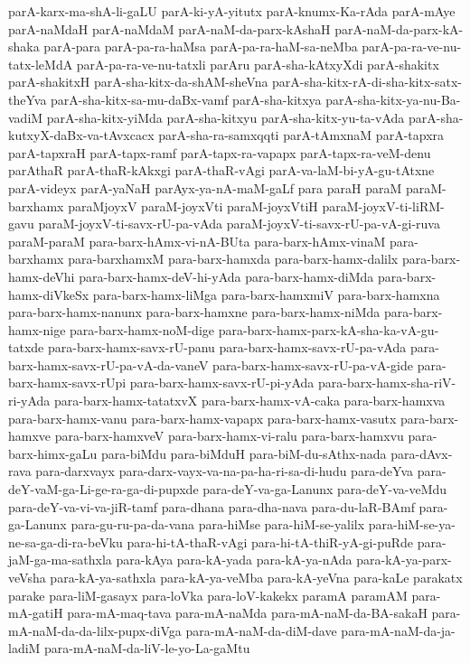 {parA-karx-ma-shA-li-gaLU
parA-ki-yA-yitutx
parA-knumx-Ka-rAda
parA-mAye
parA-naMdaH
parA-naMdaM
parA-naM-da-parx-kAshaH
parA-naM-da-parx-kA-shaka
parA-para
parA-pa-ra-haMsa
parA-pa-ra-haM-sa-neMba
parA-pa-ra-ve-nu-tatx-leMdA
parA-pa-ra-ve-nu-tatxli
parAru
parA-sha-kAtxyXdi
parA-shakitx
parA-shakitxH
parA-sha-kitx-da-shAM-sheVna
parA-sha-kitx-rA-di-sha-kitx-satx-theYva
parA-sha-kitx-sa-mu-daBx-vamf
parA-sha-kitxya
parA-sha-kitx-ya-nu-Ba-vadiM
parA-sha-kitx-yiMda
parA-sha-kitxyu
parA-sha-kitx-yu-ta-vAda
parA-sha-kutxyX-daBx-va-tAvxcacx
parA-sha-ra-samxqqti
parA-tAmxnaM
parA-tapxra
parA-tapxraH
parA-tapx-ramf
parA-tapx-ra-vapapx
parA-tapx-ra-veM-denu
parAthaR
parA-thaR-kAkxgi
parA-thaR-vAgi
parA-va-laM-bi-yA-gu-tAtxne
parA-videyx
parA-yaNaH
parAyx-ya-nA-maM-gaLf
para
paraH
paraM
paraM-barxhamx
paraMjoyxV
paraM-joyxVti
paraM-joyxVtiH
paraM-joyxV-ti-liRM-gavu
paraM-joyxV-ti-savx-rU-pa-vAda
paraM-joyxV-ti-savx-rU-pa-vA-gi-ruva
paraM-paraM
para-barx-hAmx-vi-nA-BUta
para-barx-hAmx-vinaM
para-barxhamx
para-barxhamxM
para-barx-hamxda
para-barx-hamx-dalilx
para-barx-hamx-deVhi
para-barx-hamx-deV-hi-yAda
para-barx-hamx-diMda
para-barx-hamx-diVkeSx
para-barx-hamx-liMga
para-barx-hamxmiV
para-barx-hamxna
para-barx-hamx-nanunx
para-barx-hamxne
para-barx-hamx-niMda
para-barx-hamx-nige
para-barx-hamx-noM-dige
para-barx-hamx-parx-kA-sha-ka-vA-gu-tatxde
para-barx-hamx-savx-rU-panu
para-barx-hamx-savx-rU-pa-vAda
para-barx-hamx-savx-rU-pa-vA-da-vaneV
para-barx-hamx-savx-rU-pa-vA-gide
para-barx-hamx-savx-rUpi
para-barx-hamx-savx-rU-pi-yAda
para-barx-hamx-sha-riV-ri-yAda
para-barx-hamx-tatatxvX
para-barx-hamx-vA-caka
para-barx-hamxva
para-barx-hamx-vanu
para-barx-hamx-vapapx
para-barx-hamx-vasutx
para-barx-hamxve
para-barx-hamxveV
para-barx-hamx-vi-ralu
para-barx-hamxvu
para-barx-himx-gaLu
para-biMdu
para-biMduH
para-biM-du-sAthx-nada
para-dAvx-rava
para-darxvayx
para-darx-vayx-va-na-pa-ha-ri-sa-di-hudu
para-deYva
para-deY-vaM-ga-Li-ge-ra-ga-di-pupxde
para-deY-va-ga-Lanunx
para-deY-va-veMdu
para-deY-va-vi-va-jiR-tamf
para-dhana
para-dha-nava
para-du-laR-BAmf
para-ga-Lanunx
para-gu-ru-pa-da-vana
para-hiMse
para-hiM-se-yalilx
para-hiM-se-ya-ne-sa-ga-di-ra-beVku
para-hi-tA-thaR-vAgi
para-hi-tA-thiR-yA-gi-puRde
para-jaM-ga-ma-sathxla
para-kAya
para-kA-yada
para-kA-ya-nAda
para-kA-ya-parx-veVsha
para-kA-ya-sathxla
para-kA-ya-veMba
para-kA-yeVna
para-kaLe
parakatx
parake
para-liM-gasayx
para-loVka
para-loV-kakekx
paramA
paramAM
para-mA-gatiH
para-mA-maq-tava
para-mA-naMda
para-mA-naM-da-BA-sakaH
para-mA-naM-da-da-lilx-pupx-diVga
para-mA-naM-da-diM-dave
para-mA-naM-da-ja-ladiM
para-mA-naM-da-liV-le-yo-La-gaMtu
}

